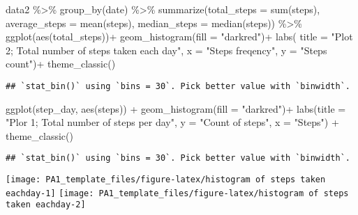 \documentclass[
]{article}
\newenvironment{Shaded}{\begin{snugshade}}{\end{snugshade}}
\newcommand{\AttributeTok}[1]{\textcolor[rgb]{0.77,0.63,0.00}{#1}}
\newcommand{\FunctionTok}[1]{\textcolor[rgb]{0.00,0.00,0.00}{#1}}
\newcommand{\NormalTok}[1]{#1}
\newcommand{\SpecialCharTok}[1]{\textcolor[rgb]{0.00,0.00,0.00}{#1}}
\newcommand{\StringTok}[1]{\textcolor[rgb]{0.31,0.60,0.02}{#1}}
\begin{document}
\begin{Shaded}
\begin{Highlighting}[]
\NormalTok{data2 }\SpecialCharTok{\%\textgreater{}\%} 
  \FunctionTok{group\_by}\NormalTok{(date) }\SpecialCharTok{\%\textgreater{}\%} 
  \FunctionTok{summarize}\NormalTok{(}\AttributeTok{total\_steps =} \FunctionTok{sum}\NormalTok{(steps),}
            \AttributeTok{average\_steps =} \FunctionTok{mean}\NormalTok{(steps),}
            \AttributeTok{median\_steps =} \FunctionTok{median}\NormalTok{(steps)) }\SpecialCharTok{\%\textgreater{}\%} 
  \FunctionTok{ggplot}\NormalTok{(}\FunctionTok{aes}\NormalTok{(total\_steps))}\SpecialCharTok{+}
      \FunctionTok{geom\_histogram}\NormalTok{(}\AttributeTok{fill =} \StringTok{"darkred"}\NormalTok{)}\SpecialCharTok{+}
      \FunctionTok{labs}\NormalTok{( }\AttributeTok{title =}  \StringTok{"Plot 2; Total number of steps taken each day"}\NormalTok{,}
                \AttributeTok{x =}  \StringTok{"Steps freqency"}\NormalTok{,}
                \AttributeTok{y =}  \StringTok{"Steps count"}\NormalTok{)}\SpecialCharTok{+}
      \FunctionTok{theme\_classic}\NormalTok{()}
\end{Highlighting}
\end{Shaded}

\begin{verbatim}
## `stat_bin()` using `bins = 30`. Pick better value with `binwidth`.
\end{verbatim}

\begin{Shaded}
\begin{Highlighting}[]
\FunctionTok{ggplot}\NormalTok{(step\_day, }\FunctionTok{aes}\NormalTok{(steps)) }\SpecialCharTok{+}
   \FunctionTok{geom\_histogram}\NormalTok{(}\AttributeTok{fill =} \StringTok{"darkred"}\NormalTok{)}\SpecialCharTok{+}
   \FunctionTok{labs}\NormalTok{(}\AttributeTok{title =} \StringTok{"Plor 1; Total number of steps per day"}\NormalTok{,}
            \AttributeTok{y =} \StringTok{"Count of steps"}\NormalTok{,}
            \AttributeTok{x =} \StringTok{"Steps"}\NormalTok{) }\SpecialCharTok{+}
   \FunctionTok{theme\_classic}\NormalTok{()}
\end{Highlighting}
\end{Shaded}

\begin{verbatim}
## `stat_bin()` using `bins = 30`. Pick better value with `binwidth`.
\end{verbatim}

\texttt{[image: PA1\_template\_files/figure-latex/histogram of steps taken eachday-1]}
\texttt{[image: PA1\_template\_files/figure-latex/histogram of steps taken eachday-2]}
\end{document}
